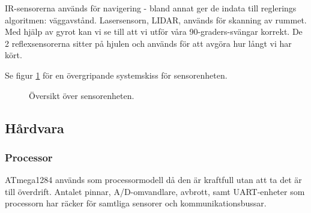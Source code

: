 \documentclass[a4paper,11pt]{article}
\begin{document}
IR-sensorerna används för navigering - bland annat ger de indata till reglerings algoritmen: väggavstånd. Lasersensorn, LIDAR, används för skanning av rummet. Med hjälp av gyrot kan vi se till att vi utför våra 90-graders-svängar korrekt. De 2 reflexsensorerna sitter på hjulen och används för att avgöra hur långt vi har kört.

Se figur \ref{fig:unitSensor} för en övergripande systemskiss för sensorenheten.

\begin{figure}[h!]
	\caption{Översikt över sensorenheten.}
	\label{fig:unitSensor}
\end{figure}

\clearpage

\subsection{Hårdvara}

\subsubsection{Processor}
ATmega1284 används som processormodell då den är kraftfull utan att ta det är till överdrift. Antalet pinnar, A/D-omvandlare, avbrott, samt UART-enheter som processorn har räcker för samtliga sensorer och kommunikationsbussar.
\end{document}
